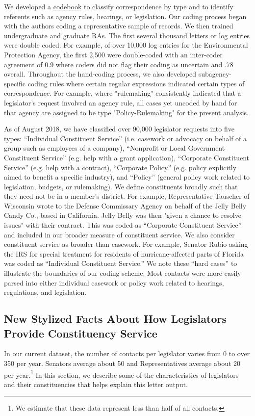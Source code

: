\documentclass{article}
\begin{document}
We developed a \href{https://docs.google.com/document/d/1fJxjXjAyRL9vX-16fSsH29anXZc-W74GMf_7BSgWkws/edit}{codebook} to classify correspondence by type and to identify referents such as agency rules, hearings, or legislation. Our coding process began with the authors coding a representative sample of records. We then trained undergraduate and graduate RAs. The first several thousand letters or log entries were double coded. For example, of over 10,000 log entries for the Environmental Protection Agency, the first 2,500 were double-coded with an inter-coder agreement of 0.9 where coders did not flag their coding as uncertain and .78 overall. Throughout the hand-coding process, we also developed subagency-specific coding rules where certain regular expressions indicated certain types of correspondence. For example, where "rulemaking" consistently indicated that a legislator's request involved an agency rule, all cases yet uncoded by hand for that agency are assigned to be type "Policy-Rulemaking" for the present analysis. 

As of August 2018, we have classified over 90,000 legislator requests into five types: ``Individual Constituent Service'' (i.e. casework or advocacy on behalf of a group such as employees of a company), ``Nonprofit or Local Government Constituent Service'' (e.g. help with a grant application), ``Corporate Constituent Service'' (e.g. help with a contract), ``Corporate Policy'' (e.g. policy explicitly aimed to benefit a specific industry), and ``Policy'' (general policy work related to legislation, budgets, or rulemaking). 
We define constituents broadly such that they need not be in a member's district. For example, Representative Tauscher of Wisconsin wrote to the Defense Commissary Agency on behalf of the Jelly Belly Candy Co., based in California. Jelly Belly was then "given a chance to resolve issues" with their contract. This was coded as ``Corporate Constituent Service'' and included in our broader measure of constituent service.  We also consider constituent service as broader than casework. For example, Senator Rubio asking the IRS for special treatment for residents of hurricane-affected parts of Florida was coded as ``Individual Constituent Service.'' We note these ``hard cases'' to illustrate the boundaries of our coding scheme. Most contacts were more easily parsed into either individual casework or policy work related to hearings, regulations, and legislation.

\subsection{New Stylized Facts About How Legislators Provide Constituency Service}
In our current dataset, the number of contacts per legislator varies from 0 to over 350 per year. Senators average about 50 and Representatives average about 20 per year.\footnote{We estimate that these data represent less than half of all contacts.} In this section, we describe some of the characteristics of legislators and their constituencies that helps explain this letter output.  
\end{document}

